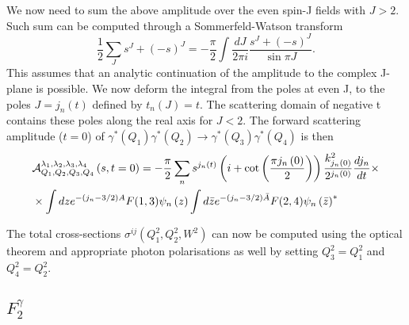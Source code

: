 \documentclass[preprint, 12pt]{elsarticle}
\begin{document}
We now need to sum the above amplitude over the even spin-J fields with $J>2$. Such sum can be computed through a Sommerfeld-Watson transform
\begin{equation}
\frac{1}{2} \sum_J s^J + (-s)^J = -\frac{\pi}{2} \int \frac{dJ}{2 \pi i} \frac{s^J + (-s)^J}{\sin \pi J}.
\end{equation}
This assumes that an analytic continuation of the amplitude to the complex J-plane is possible. We now deform the integral from the poles at even J, to the poles $J = j_n\left(t\right)$ defined by $t_n(J) = t$. The scattering domain of negative t contains these poles along the real axis for $J<2$. The forward scattering amplitude ($t= 0$) of $\gamma^{*}\left(Q_1\right)\gamma^{*}\left(Q_2\right) \rightarrow \gamma^{*}\left(Q_3\right) \gamma^{*}\left(Q_4\right)$ is then
\begin{align}
&\mathcal{A}^{\lambda_1, \lambda_2, \lambda_3, \lambda_4}_{Q_1, Q_2, Q_3, Q_4}\left(s,t = 0\right) = - \frac{\pi}{2} \sum_n s^{j_n\left(t\right)} \left( i + \cot\left(\frac{\pi j_n\left(0\right)}{2}\right) \right) \frac{k_{j_n\left(0\right)}^2}{2^{j_n\left(0\right)}} \frac{d j_n}{dt} \times \notag \\
& \times \int dz e^{-\left(j_n - 3/2\right) A} F(1,3) \psi_n\left(z\right) \int d\bar{z} e^{-(j_n-3/2)\bar{A}} F(2,4) {\psi_n\left(\bar{z}\right)}^*
\label{eq:scattering_amplitude}
\end{align}

The total cross-sections $\sigma^{ij}\left(Q_1^2, Q_2^2, W^2\right)$ can now be computed using the optical theorem and appropriate photon polarisations as well by setting $Q_3^2 = Q_1^2$ and $Q_4^2 = Q_2^2$.

\subsection{$F_2^\gamma$}
\end{document}
